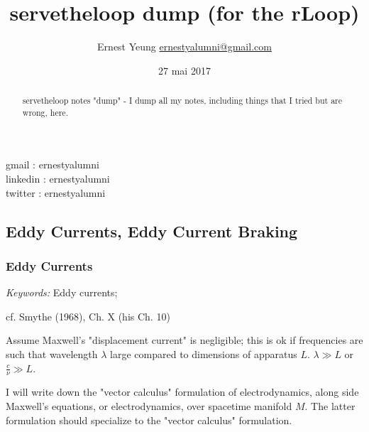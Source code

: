 \documentclass[10pt]{amsart}
\title{%
  \large servetheloop dump (for the rLoop) }
\author{Ernest Yeung \href{mailto:ernestyalumni@gmail.com}{ernestyalumni@gmail.com}}
\date{27 mai 2017}
\begin{document}

\maketitle


\noindent gmail        : ernestyalumni \\
linkedin     : ernestyalumni \\
twitter      : ernestyalumni \\

\setcounter{tocdepth}{1}
\tableofcontents


\begin{multicols*}{2}

  



\begin{abstract}
servetheloop notes "dump" - I dump all my notes, including things that I tried but are wrong, here.  

\end{abstract}

\part{Eddy Currents, Eddy Current Braking}

\section{Eddy Currents}

\emph{Keywords:} Eddy currents;

cf. Smythe (1968), Ch. X (his Ch. 10) \cite{Smyt1968}

Assume Maxwell's "displacement current" is negligible; this is ok if frequencies are such that wavelength $\lambda$ large compared to dimensions of apparatus $L$.  $\lambda \gg L$ or $\frac{c}{\nu} \gg L$.  

I will write down the "vector calculus" formulation of electrodynamics, along side Maxwell's equations, or electrodynamics, over spacetime manifold $M$.  The latter formulation should specialize to the "vector calculus" formulation.  


\end{multicols*}
\end{document}

